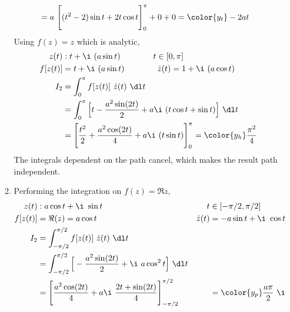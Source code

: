 \begin{enumerate}
\begin{enumerate}
\begin{align}
                               & = a\ \Bigg[ (t^2 - 2)\sin t + 2t\cos t \Bigg]_0^\pi
                        + 0 + 0
                        = \color{y_t} -2at
                    \end{align}
                    Using $ f(z) = z$ which is analytic,
                    \begin{align}
                        z(t)    & : t + \i\ (a\sin t) \qquad\qquad
                        t \in [0, \pi]                                           \\
                        f[z(t)] & = t + \i\ (a\sin t) \qquad\qquad
                        \dot{z}(t) = 1 + \i\ (a\cos t)                           \\
                        I_2     & = \int_{0}^{\pi} f[z(t)]
                        \ \dot{z}(t)\ \dl t                                      \\
                                & = \int_{0}^{\pi} \Big[t
                            - \frac{a^2\sin(2t)}{2}
                        + a\i\ (t \cos t + \sin t)\Big]\ \dl t                   \\
                                & = \Bigg[ \frac{t^2}{2} + \frac{a^2\cos(2t)}{4}
                            + a\i\ (t \sin t) \Bigg]_0^\pi
                        = \color{y_h} \frac{\pi^2}{4}
                    \end{align}
                    The integrals dependent on the path cancel, which makes the result
                    path independent.

              \item Performing the integration on $ f(z) = \Re{z} $,
                    \begin{align}
                        z(t)       & : a\cos t + \i\ \sin t               &
                        t          & \in [-\pi/2, \pi/2]                    \\
                        f[z(t)]    & = \Re{(z)} = a\cos t                 &
                        \dot{z}(t) & = -a\sin t + \i\ \cos t                \\
                        I_2        & = \int_{-\pi/2}^{\pi/2} f[z(t)]
                        \ \dot{z}(t)\ \dl t                                 \\
                                   & = \int_{-\pi/2}^{\pi/2} \Big[
                            -\frac{a^2 \sin(2t)}{2} + \i\ a\cos^2 t\Big]
                        \ \dl t                                             \\
                                   & = \Bigg[ \frac{a^2\cos(2t)}{4} + a\i
                            \ \frac{2t + \sin(2t)}{4} \Bigg]_{-\pi/2}
                        ^{\pi/2}   &
                                   & = \color{y_p} \frac{a\pi}{2}\ \i
                    \end{align}
          \end{enumerate}


\end{enumerate}
